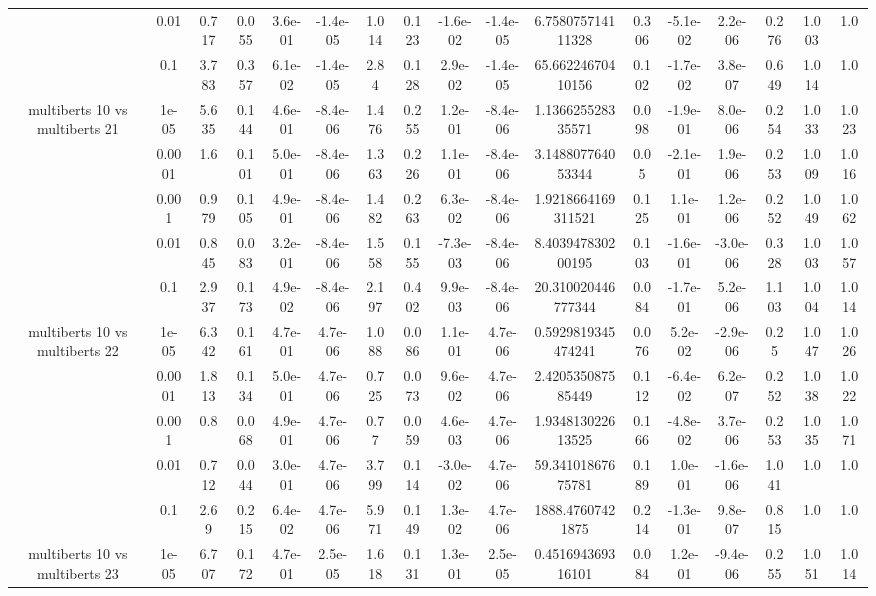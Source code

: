 \begin{tabular}{|c|c|c|c|c|c|c|c|c|c|c|c|c|c|c|c|c|}
 & 0.01 & 0.717 & 0.055 & 3.6e-01 & -1.4e-05 & 1.014 & 0.123 & -1.6e-02 & -1.4e-05 & 6.758075714111328 & 0.306 & -5.1e-02 & 2.2e-06 & 0.276 & 1.003 & 1.0 \\
 & 0.1 & 3.783 & 0.357 & 6.1e-02 & -1.4e-05 & 2.84 & 0.128 & 2.9e-02 & -1.4e-05 & 65.66224670410156 & 0.102 & -1.7e-02 & 3.8e-07 & 0.649 & 1.014 & 1.0 \\
\hline
\multirow{5}{*}{multiberts 10 vs multiberts 21} & 1e-05 & 5.635 & 0.144 & 4.6e-01 & -8.4e-06 & 1.476 & 0.255 & 1.2e-01 & -8.4e-06 & 1.136625528335571 & 0.098 & -1.9e-01 & 8.0e-06 & 0.254 & 1.033 & 1.023 \\
 & 0.0001 & 1.6 & 0.101 & 5.0e-01 & -8.4e-06 & 1.363 & 0.226 & 1.1e-01 & -8.4e-06 & 3.148807764053344 & 0.05 & -2.1e-01 & 1.9e-06 & 0.253 & 1.009 & 1.016 \\
 & 0.001 & 0.979 & 0.105 & 4.9e-01 & -8.4e-06 & 1.482 & 0.263 & 6.3e-02 & -8.4e-06 & 1.9218664169311521 & 0.125 & 1.1e-01 & 1.2e-06 & 0.252 & 1.049 & 1.062 \\
 & 0.01 & 0.845 & 0.083 & 3.2e-01 & -8.4e-06 & 1.558 & 0.155 & -7.3e-03 & -8.4e-06 & 8.403947830200195 & 0.103 & -1.6e-01 & -3.0e-06 & 0.328 & 1.003 & 1.057 \\
 & 0.1 & 2.937 & 0.173 & 4.9e-02 & -8.4e-06 & 2.197 & 0.402 & 9.9e-03 & -8.4e-06 & 20.310020446777344 & 0.084 & -1.7e-01 & 5.2e-06 & 1.103 & 1.004 & 1.014 \\
\hline
\multirow{5}{*}{multiberts 10 vs multiberts 22} & 1e-05 & 6.342 & 0.161 & 4.7e-01 & 4.7e-06 & 1.088 & 0.086 & 1.1e-01 & 4.7e-06 & 0.5929819345474241 & 0.076 & 5.2e-02 & -2.9e-06 & 0.25 & 1.047 & 1.026 \\
 & 0.0001 & 1.813 & 0.134 & 5.0e-01 & 4.7e-06 & 0.725 & 0.073 & 9.6e-02 & 4.7e-06 & 2.420535087585449 & 0.112 & -6.4e-02 & 6.2e-07 & 0.252 & 1.038 & 1.022 \\
 & 0.001 & 0.8 & 0.068 & 4.9e-01 & 4.7e-06 & 0.77 & 0.059 & 4.6e-03 & 4.7e-06 & 1.934813022613525 & 0.166 & -4.8e-02 & 3.7e-06 & 0.253 & 1.035 & 1.071 \\
 & 0.01 & 0.712 & 0.044 & 3.0e-01 & 4.7e-06 & 3.799 & 0.114 & -3.0e-02 & 4.7e-06 & 59.34101867675781 & 0.189 & 1.0e-01 & -1.6e-06 & 1.041 & 1.0 & 1.0 \\
 & 0.1 & 2.69 & 0.215 & 6.4e-02 & 4.7e-06 & 5.971 & 0.149 & 1.3e-02 & 4.7e-06 & 1888.47607421875 & 0.214 & -1.3e-01 & 9.8e-07 & 0.815 & 1.0 & 1.0 \\
\hline
\multirow{5}{*}{multiberts 10 vs multiberts 23} & 1e-05 & 6.707 & 0.172 & 4.7e-01 & 2.5e-05 & 1.618 & 0.131 & 1.3e-01 & 2.5e-05 & 0.451694369316101 & 0.084 & 1.2e-01 & -9.4e-06 & 0.255 & 1.051 & 1.014 \\

\end{tabular}
